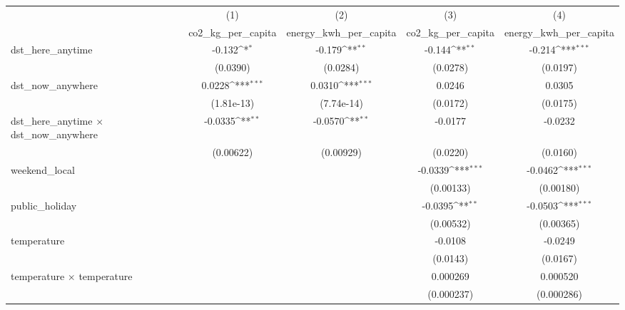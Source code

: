{
\def\sym#1{\ifmmode^{#1}\else\(^{#1}\)\fi}
\begin{tabular}{l*{4}{c}}
\hline\hline
                    &\multicolumn{1}{c}{(1)}&\multicolumn{1}{c}{(2)}&\multicolumn{1}{c}{(3)}&\multicolumn{1}{c}{(4)}\\
                    &\multicolumn{1}{c}{co2\_kg\_per\_capita}&\multicolumn{1}{c}{energy\_kwh\_per\_capita}&\multicolumn{1}{c}{co2\_kg\_per\_capita}&\multicolumn{1}{c}{energy\_kwh\_per\_capita}\\
\hline
dst\_here\_anytime    &      -0.132\sym{*}  &      -0.179\sym{**} &      -0.144\sym{**} &      -0.214\sym{***}\\
                    &    (0.0390)         &    (0.0284)         &    (0.0278)         &    (0.0197)         \\
[1em]
dst\_now\_anywhere    &      0.0228\sym{***}&      0.0310\sym{***}&      0.0246         &      0.0305         \\
                    &  (1.81e-13)         &  (7.74e-14)         &    (0.0172)         &    (0.0175)         \\
[1em]
dst\_here\_anytime $\times$ dst\_now\_anywhere&     -0.0335\sym{**} &     -0.0570\sym{**} &     -0.0177         &     -0.0232         \\
                    &   (0.00622)         &   (0.00929)         &    (0.0220)         &    (0.0160)         \\
[1em]
weekend\_local       &                     &                     &     -0.0339\sym{***}&     -0.0462\sym{***}\\
                    &                     &                     &   (0.00133)         &   (0.00180)         \\
[1em]
public\_holiday      &                     &                     &     -0.0395\sym{**} &     -0.0503\sym{***}\\
                    &                     &                     &   (0.00532)         &   (0.00365)         \\
[1em]
temperature         &                     &                     &     -0.0108         &     -0.0249         \\
                    &                     &                     &    (0.0143)         &    (0.0167)         \\
[1em]
temperature $\times$ temperature&                     &                     &    0.000269         &    0.000520         \\
                    &                     &                     &  (0.000237)         &  (0.000286)         \\

\end{tabular}}
